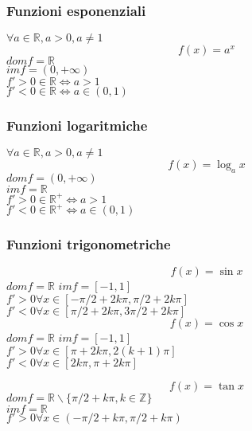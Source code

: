\documentclass[a4paper,12pt]{article}
\theoremstyle{mystyle}
\begin{document}
\subsubsection{Funzioni esponenziali}
\(\forall a\in \mathbb R,a >0, a \neq 1\)\\
\begin{equation}
    f(x)=a^x
\end{equation}
\(dom f = \mathbb R\)\\
\(im f = (0, + \infty)\)\\
\(f'>0 \in \mathbb R \Leftrightarrow a >1\)\\
\(f'<0 \in \mathbb R \Leftrightarrow a \in (0,1)\)

\subsubsection{Funzioni logaritmiche}
\(\forall a \in \mathbb R, a >0, a \neq 1\)
\begin{equation}
    f(x)= \log_a x
\end{equation}
\(dom f= (0,+\infty)\)\\
\(im f = \mathbb R\)\\
\(f'>0 \in \mathbb R^+ \Leftrightarrow a >1\)\\
\(f'<0 \in \mathbb R^+ \Leftrightarrow a \in (0,1)\)

\subsubsection{Funzioni trigonometriche}
\begin{equation}
    f(x)= \sin x
\end{equation}
\(dom f = \mathbb R\)
\(im f = [-1,1]\)\\
\(f'>0 \forall x \in[-\pi/2+2k\pi,\pi/2+2k\pi]\)\\
\(f'<0 \forall x \in [\pi/2+2k\pi, 3\pi/2 + 2k\pi]\)\\

\begin{equation}
    f(x)= \cos x
\end{equation}
\(dom f = \mathbb R\)
\(im f = [-1,1]\)\\
\(f'>0 \forall x \in [\pi + 2k \pi, 2(k+1)\pi]\)\\
\(f'<0 \forall x \in [2k\pi, \pi + 2k\pi]\)

\begin{equation}
    f(x) = \tan x
\end{equation}
\(dom f = \mathbb R \backslash \{\pi / 2 + k \pi, k \in \mathbb Z\}\)\\
\(im f = \mathbb R\)\\
\(f'>0 \forall x \in (-\pi/2+k\pi,\pi/2+k\pi)\)
\end{document}
